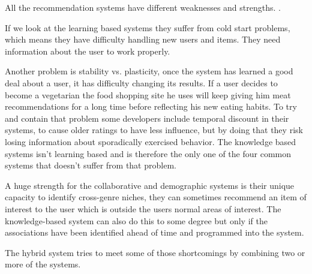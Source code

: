 All the recommendation systems have different weaknesses and strengths. \cite{TheAdaptiveWeb}.

If we look at the learning based systems they suffer from cold start problems, which means they have difficulty handling new users and items. They need information about the user to work properly. 

Another problem is stability vs. plasticity, once the system has learned a good deal about a user, it has difficulty changing its results. If a user decides to become a vegetarian the food shopping site he uses will keep giving him meat recommendations for a long time before reflecting his new eating habits. To try and contain that problem some developers include temporal discount in their systems, to cause older ratings to have less influence, but by doing that they risk losing information about sporadically exercised behavior. The knowledge based systems isn't learning based and is therefore the only one of the four common systems that doesn't suffer from that problem.

A huge strength for the collaborative and demographic systems is their unique capacity to identify cross-genre niches, they can sometimes recommend an item of interest to the user which is outside the users normal areas of interest. The knowledge-based system can also do this to some degree but only if the associations have been identified ahead of time and programmed into the system.

The hybrid system tries to meet some of those shortcomings by combining two or more of the systems. 
